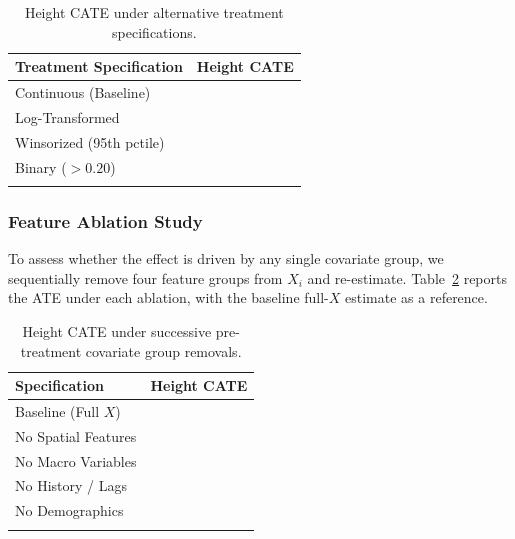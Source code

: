 \documentclass[11pt, letterpaper, oneside]{article}
\begin{document}
\begin{table}[!htbp]
\centering
\caption[Treatment Definition Robustness]{Height CATE under alternative treatment specifications.}
\label{tab:treatment_robustness}
\begin{tabular}{lc}
\toprule
\textbf{Treatment Specification} & \textbf{Height CATE} \\
\midrule
Continuous (Baseline)   & \metricRobustTreatContinuous{} \\
Log-Transformed         & \metricRobustTreatLog{} \\
Winsorized (95th pctile) & \metricRobustTreatWinsorized{} \\
Binary ($>0.20$)        & \metricRobustTreatBinary{} \\
\bottomrule
\multicolumn{2}{l}{\footnotesize }\\
\end{tabular}
\end{table}

\subsubsection{Feature Ablation Study}

To assess whether the effect is driven by any single covariate group, we sequentially remove four feature groups from $X_i$ and re-estimate. Table~\ref{tab:ablation} reports the ATE under each ablation, with the baseline full-$X$ estimate as a reference.

\begin{table}[!htbp]
\centering
\caption[Feature Group Ablation Study]{Height CATE under successive pre-treatment covariate group removals.}
\label{tab:ablation}
\begin{tabular}{lc}
\toprule
\textbf{Specification} & \textbf{Height CATE} \\
\midrule
Baseline (Full $X$)   & \metricRobustAblateBaseline{} \\
No Spatial Features   & \metricRobustAblateNoSpatial{} \\
No Macro Variables    & \metricRobustAblateNoMacro{} \\
No History / Lags     & \metricRobustAblateNoHistory{} \\
No Demographics       & \metricRobustAblateNoDemographics{} \\
\bottomrule
\multicolumn{2}{l}{\footnotesize }\\
\end{tabular}
\end{table}


\cleardoublepage

\cleardoublepage
{}
{}
{\singlespacing


}

\newpage
\end{document}
